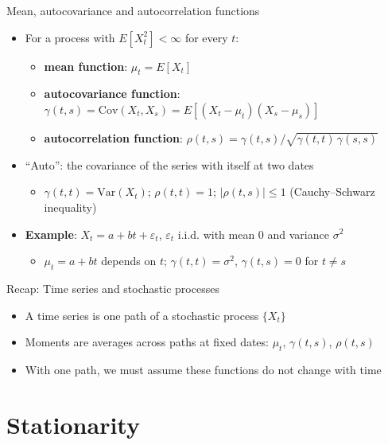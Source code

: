 \begin{frame}{Mean, autocovariance and autocorrelation functions}
\itemsize{\small}
\begin{itemize}
    \item For a process with $E[X_t^2] < \infty$ for every $t$:
    \begin{itemize}
        \item \textbf{mean function}: $\mu_t = E[X_t]$
        \item \textbf{autocovariance function}: $\gamma(t, s) = \mathrm{Cov}(X_t, X_s) = E[(X_t - \mu_t)(X_s - \mu_s)]$
        \item \textbf{autocorrelation function}: $\rho(t, s) = \gamma(t, s)/\sqrt{\gamma(t, t)\,\gamma(s, s)}$
    \end{itemize}
    \item ``Auto'': the covariance of the series with itself at two dates
    \begin{itemize}
        \item $\gamma(t, t) = \mathrm{Var}(X_t)$; $\rho(t, t) = 1$; $|\rho(t, s)| \le 1$ (Cauchy--Schwarz inequality)
    \end{itemize}
    \item \textbf{Example}: $X_t = a + bt + \varepsilon_t$, $\varepsilon_t$ i.i.d. with mean 0 and variance $\sigma^2$
    \begin{itemize}
        \item $\mu_t = a + bt$ depends on $t$; $\gamma(t, t) = \sigma^2$, $\gamma(t, s) = 0$ for $t \ne s$
    \end{itemize}
\end{itemize}
\end{frame}

\begin{frame}{Recap: Time series and stochastic processes}
\itemsize{\small}
\begin{itemize}
    \item A time series is one path of a stochastic process $\{X_t\}$
    \item Moments are averages across paths at fixed dates: $\mu_t$, $\gamma(t, s)$, $\rho(t, s)$
    \item With one path, we must assume these functions do not change with time
\end{itemize}
\end{frame}


\section{Stationarity}

